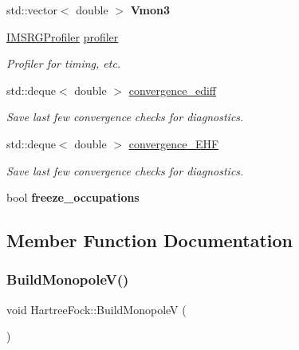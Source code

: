 \begin{DoxyCompactItemize}
std\+::vector$<$ double $>$ {\bfseries Vmon3}
\item 
\mbox{\label{classHartreeFock_a0435b3f1485ddd1d8d91bbd84e008445}} 
\hyperlink{classIMSRGProfiler}{I\+M\+S\+R\+G\+Profiler} \hyperlink{classHartreeFock_a0435b3f1485ddd1d8d91bbd84e008445}{profiler}
\begin{DoxyCompactList}\small\item\em Profiler for timing, etc. \end{DoxyCompactList}\item 
\mbox{\label{classHartreeFock_a42d87e7ce2ad6e56d12063a62ff91bf9}} 
std\+::deque$<$ double $>$ \hyperlink{classHartreeFock_a42d87e7ce2ad6e56d12063a62ff91bf9}{convergence\+\_\+ediff}
\begin{DoxyCompactList}\small\item\em Save last few convergence checks for diagnostics. \end{DoxyCompactList}\item 
\mbox{\label{classHartreeFock_ac1366b8f034fb0feb9aed43480398f54}} 
std\+::deque$<$ double $>$ \hyperlink{classHartreeFock_ac1366b8f034fb0feb9aed43480398f54}{convergence\+\_\+\+E\+HF}
\begin{DoxyCompactList}\small\item\em Save last few convergence checks for diagnostics. \end{DoxyCompactList}\item 
\mbox{\label{classHartreeFock_a5dba3b4a2fd164c68daeb7a744ede3c6}} 
bool {\bfseries freeze\+\_\+occupations}
\end{DoxyCompactItemize}


\subsection{Member Function Documentation}
\mbox{\label{classHartreeFock_a3d6bac9b4403e4bc599a89ad0c9b6056}} 
\subsubsection{\texorpdfstring{Build\+Monopole\+V()}{BuildMonopoleV()}}
{\footnotesize\ttfamily void Hartree\+Fock\+::\+Build\+MonopoleV (\begin{DoxyParamCaption}{ }\end{DoxyParamCaption})}



